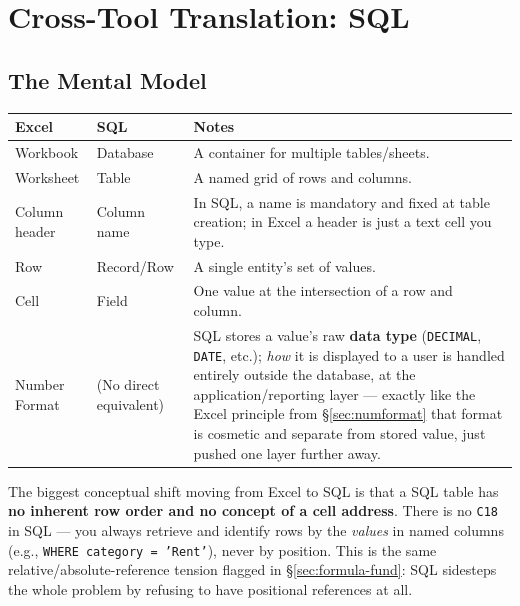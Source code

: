 \documentclass[11pt,a4paper]{article}
\begin{document}
\section{Cross-Tool Translation: SQL}
\label{sec:sql-mapping}

\subsection{The Mental Model}

\begin{center}
\begin{tabular}{@{}p{3.4cm}p{3.4cm}p{6.4cm}@{}}
\toprule
\textbf{Excel} & \textbf{SQL} & \textbf{Notes} \\
\midrule
Workbook & Database & A container for multiple tables/sheets. \\
Worksheet & Table & A named grid of rows and columns. \\
Column header & Column name & In SQL, a name is mandatory and fixed at table creation; in Excel a header is just a text cell you type. \\
Row & Record/Row & A single entity's set of values. \\
Cell & Field & One value at the intersection of a row and column. \\
Number Format & (No direct equivalent) & SQL stores a value's raw \textbf{data type} (\texttt{DECIMAL}, \texttt{DATE}, etc.); \emph{how} it is displayed to a user is handled entirely outside the database, at the application/reporting layer --- exactly like the Excel principle from \S\ref{sec:numformat} that format is cosmetic and separate from stored value, just pushed one layer further away. \\
\bottomrule
\end{tabular}
\end{center}

\begin{keyconcept}
The biggest conceptual shift moving from Excel to SQL is that a SQL table has \textbf{no inherent row order and no concept of a cell address}. There is no \texttt{C18} in SQL --- you always retrieve and identify rows by the \emph{values} in named columns (e.g., \texttt{WHERE category = 'Rent'}), never by position. This is the same relative/absolute-reference tension flagged in \S\ref{sec:formula-fund}: SQL sidesteps the whole problem by refusing to have positional references at all.
\end{keyconcept}
\end{document}
